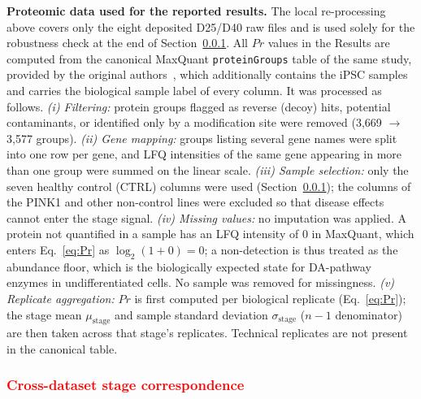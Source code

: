\documentclass[5p,times,twocolumn]{elsarticle}
\newcommand{\rtag}[1]{}
\newcommand{\rev}[2]{\rtag{#1}\textcolor{red}{#2}}
\newenvironment{revblock}[1]{\par\color{red}\rtag{#1}\ignorespaces}{\par}
\begin{document}
\begin{revblock}{R2.4}
  \textbf{Proteomic data used for the reported results.}
  The local re-processing above covers only the eight
  deposited D25/D40 raw files and is used solely for the
  robustness check at the end of
  Section~\ref{sec:matching}.
  All $Pr$ values in the Results are computed from the
  canonical MaxQuant \texttt{proteinGroups} table of the same
  study, provided by the original
  authors~\cite{novak2022single}, which additionally contains
  the iPSC samples and carries the biological sample label of
  every column.
  It was processed as follows.
  \textit{(i) Filtering:} protein groups flagged as reverse
  (decoy) hits, potential contaminants, or identified only by
  a modification site were removed (3,669 $\to$ 3,577 groups).
  \textit{(ii) Gene mapping:} groups listing several gene
  names were split into one row per gene, and LFQ intensities
  of the same gene appearing in more than one group were
  summed on the linear scale.
  \textit{(iii) Sample selection:} only the seven healthy
  control (CTRL) columns were used
  (Section~\ref{sec:matching}); the columns of the PINK1 and
  other non-control lines were excluded so that disease effects
  cannot enter the stage signal.
  \textit{(iv) Missing values:} no imputation was applied.
  A protein not quantified in a sample has an LFQ intensity of
  0 in MaxQuant, which enters Eq.~\eqref{eq:Pr} as
  $\log_{2}(1+0) = 0$; a non-detection is thus treated as the
  abundance floor, which is the biologically expected state for
  DA-pathway enzymes in undifferentiated cells.
  No sample was removed for missingness.
  \textit{(v) Replicate aggregation:} $Pr$ is first computed
  per biological replicate (Eq.~\eqref{eq:Pr}); the stage mean
  $\mu_{\text{stage}}$ and sample standard deviation
  $\sigma_{\text{stage}}$ ($n-1$ denominator) are then taken
  across that stage's replicates.
  Technical replicates are not present in the canonical table.
\end{revblock}



\subsubsection{\rev{R2.22}{Cross-dataset stage correspondence}}
\label{sec:matching}
\end{document}
